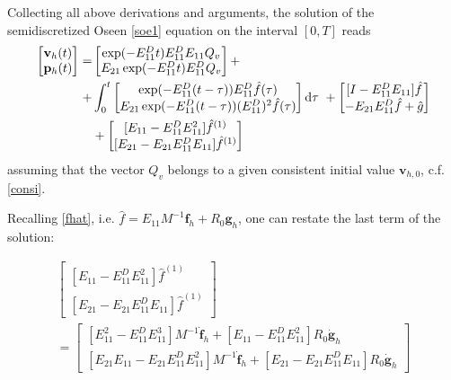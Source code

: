 \documentclass[a4paper,10pt,BCOR=15mm]{scrbook}
\providecommand{\inva}[1]{\text{d} #1}
\begin{document}
Collecting all above derivations and arguments, the solution of the semidiscretized Oseen \eqref{soe1} equation on the interval $[0,T]$ reads
\begin{align}
 \begin{bmatrix} \mathbf v_h(t) \\ \mathbf p_h(t) \end{bmatrix} =& \begin{bmatrix} \exp(-E_{11}^Dt) E_{11}^DE_{11}Q_v \\ E_{21}\exp(-E_{11}^Dt) E_{11}^DQ_v \end{bmatrix} + \notag \\
+&\int_0^t \begin{bmatrix} \exp(-E_{11}^D(t-\tau)) E_{11}^D\hat f(\tau) \\ E_{21}\exp(-E_{11}^D(t-\tau)) (E_{11}^D)^2\hat f(\tau) \end{bmatrix} \inva{\tau} ~+ 
 \begin{bmatrix} [I-E_{11}^D E_{11}] \hat f \\  -E_{21}E_{11}^D \hat f + \hat g \end{bmatrix} \notag \\&+ \begin{bmatrix}[E_{11}-E_{11}^D E_{11}^2] \hat{f}^{(1)} \\ [E_{21}-E_{21}E_{11}^D E_{11}] \hat{f}^{(1)}\end{bmatrix} \label{lastterm}
\end{align}
assuming that the vector $Q_v$ belongs to a given consistent initial value $\mathbf v_{h,0}$, c.f. \eqref{consi}.

Recalling \eqref{fhat}, i.e. $
 \hat f = E_{11}M^{-1}\mathbf f_h + R_0 \mathbf g_h$, one can restate the last term of the solution:

\begin{multline}\label{inde11}
\begin{bmatrix}[E_{11}-E_{11}^D E_{11}^2] \hat{f}^{(1)} \\ [E_{21}-E_{21}E_{11}^D E_{11}] \hat{f}^{(1)}\end{bmatrix} \\= 
\begin{bmatrix}[E_{11}^2-E_{11}^D E_{11}^3]M^{-1}\dot{ \mathbf f}_h + [E_{11}-E_{11}^D E_{11}^2]R_0 \dot {\mathbf g}_h\\ [E_{21}E_{11}-E_{21}E_{11}^D E_{11}^2] M^{-1}\dot{\mathbf f}_h +  [E_{21}-E_{21}E_{11}^D E_{11}] R_0 \dot {\mathbf g}_h \end{bmatrix}
\end{multline}
\end{document}
